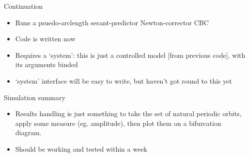 \documentclass[presentation]{beamer}
\begin{document}
\begin{frame}[plain,label={sec:org0e0455e}]{Continuation}
\begin{itemize}
\item Runs a psuedo-arclength secant-predictor Newton-corrector CBC
\item Code is written now
\item Requires a `system': this is just a controlled model [from previous code], with its arguments binded
\item `system' interface will be easy to write, but haven't got round to this yet
\end{itemize}
\end{frame}

\begin{frame}[plain,label={sec:org0ad523b}]{Simulation summary}
\begin{itemize}
\item Results handling is just something to take the set of natural periodic orbits, apply some measure (eg. amplitude), then plot them on a bifurcation diagram.
\item Should be working and tested within a week
\end{itemize}
\end{frame}
\end{document}

